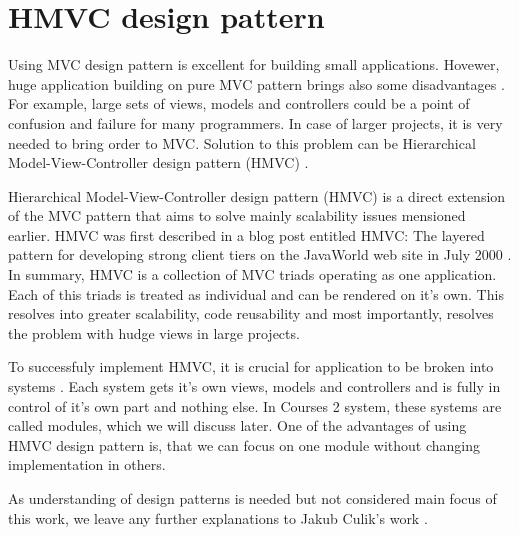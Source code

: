 \section{HMVC design pattern}

Using MVC design pattern is excellent for building small applications. Hovewer, huge application building on pure MVC pattern brings also some disadvantages \cite{culik}. For example, large sets of views, models and controllers could be a point of confusion and failure for many programmers. In case of larger projects, it is very needed to bring order to MVC. Solution to this problem can be Hierarchical Model-View-Controller design pattern (HMVC) \cite{hmvc}.


Hierarchical Model-View-Controller design pattern (HMVC) is a direct extension of the MVC pattern that aims to solve mainly scalability issues mensioned earlier. HMVC was first described in a blog post entitled HMVC: The layered pattern for developing strong client tiers on the JavaWorld web site in July 2000 \cite{hmvc}. In summary, HMVC is a collection of MVC triads operating as one application. Each of this triads is treated as individual and can be rendered on it's own. This resolves into greater scalability, code reusability and most importantly, resolves the problem with hudge views in large projects.


To successfuly implement HMVC, it is crucial for application to be broken into systems \cite{hmvc}. Each system gets it's own views, models and controllers and is fully in control of it's own part and nothing else. In Courses 2 system, these systems are called modules, which we will discuss later. One of the advantages of using HMVC design pattern is, that we can focus on one module without changing implementation in others.


As understanding of design patterns is needed but not considered main focus of this work, we leave any further explanations to Jakub Culik's work \cite{culik}.